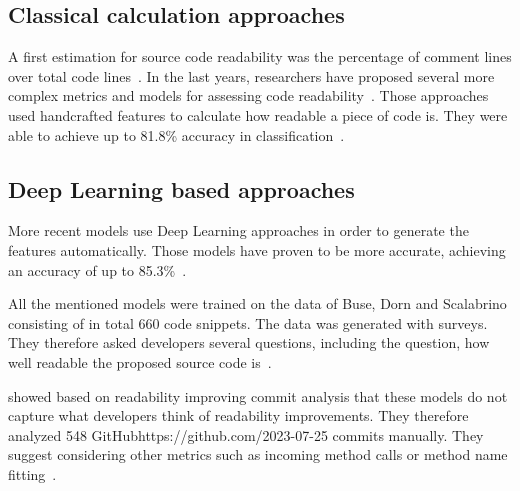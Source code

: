 \documentclass[%
class=scrreprt,
chapterprefix=false,%
open=right,%
twoside=false,%
paper=a4,%
logofile={Logo\_zentral\_farbig\_EN.png},%
thesistype=master,%
UKenglish,%
]{se2thesis}
\begin{document}
%	
%	
%	
	
	\subsection{Classical calculation approaches} \label{Classical calculation approaches}
	A first estimation for source code readability was the percentage of comment lines over total code lines~\cite{aggarwal2002integrated}. In the last years, researchers have proposed several more complex metrics and models for assessing code readability~\cite{buse2009learning, posnett2011simpler, dorn2012general, scalabrino2018comprehensive}.
	Those approaches used handcrafted features to calculate how readable a piece of code is. They were able to achieve up to 81.8\% accuracy in classification~\cite{scalabrino2018comprehensive}.
	
	\subsection{Deep Learning based approaches} \label{(Deep) Learning based approaches}
	More recent models use Deep Learning approaches in order to generate the features automatically. Those models have proven to be more accurate, achieving an accuracy of up to 85.3\%~\cite{mi2018improving, mi2022towards}.
	
	All the mentioned models were trained on the data of Buse, Dorn and Scalabrino consisting of in total 660 code snippets. The data was generated with surveys. They therefore asked developers several questions, including the question, how well readable the proposed source code is~\cite{buse2009learning, dorn2012general, scalabrino2018comprehensive}.
	
	\citeauthor{fakhoury2019improving} showed based on readability improving commit analysis that these models do not capture what developers think of readability improvements. They therefore analyzed 548 GitHub{https://github.com/}{2023-07-25} commits manually. They suggest considering other metrics such as incoming method calls or method name fitting~\cite{fakhoury2019improving}.
	
\end{document}
